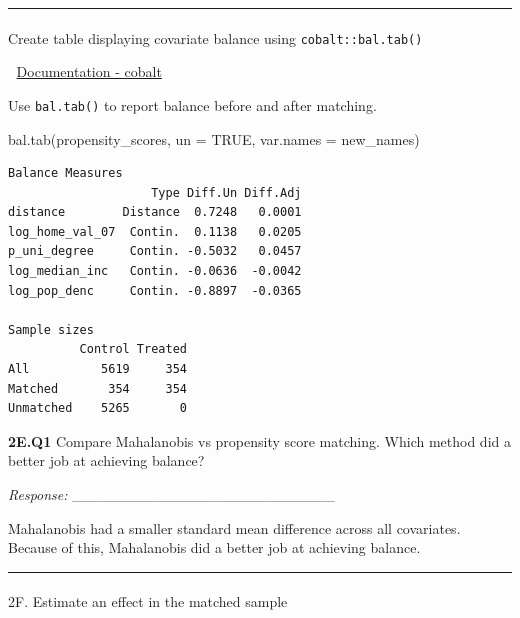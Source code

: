 \documentclass[
  letterpaper,
  DIV=11,
  numbers=noendperiod]{scrartcl}
\makeatletter
\let\oldparagraph\paragraph
\renewcommand{\paragraph}{
    \@ifstar
      \xxxParagraphStar
      \xxxParagraphNoStar
  }
\newcommand{\xxxParagraphStar}[1]{\oldparagraph*{#1}\mbox{}}
\newcommand{\xxxParagraphNoStar}[1]{\oldparagraph{#1}\mbox{}}
\newenvironment{Shaded}{\begin{snugshade}}{\end{snugshade}}
\newcommand{\AttributeTok}[1]{\textcolor[rgb]{0.40,0.45,0.13}{#1}}
\newcommand{\ConstantTok}[1]{\textcolor[rgb]{0.56,0.35,0.01}{#1}}
\newcommand{\FunctionTok}[1]{\textcolor[rgb]{0.28,0.35,0.67}{#1}}
\newcommand{\NormalTok}[1]{\textcolor[rgb]{0.00,0.23,0.31}{#1}}
\makeatother
\begin{document}
\begin{center}\rule{0.5\linewidth}{0.5pt}\end{center}

\paragraph{\texorpdfstring{Create table displaying covariate balance
using
\texttt{cobalt::bal.tab()}}{Create table displaying covariate balance using cobalt::bal.tab()}}\label{create-table-displaying-covariate-balance-using-cobaltbal.tab}

📜 \href{https://ngreifer.github.io/cobalt/}{Documentation - cobalt}

Use \texttt{bal.tab()} to report balance before and after matching.

\begin{Shaded}
\begin{Highlighting}[]
\FunctionTok{bal.tab}\NormalTok{(propensity\_scores, }
        \AttributeTok{un =} \ConstantTok{TRUE}\NormalTok{,}
        \AttributeTok{var.names =}\NormalTok{ new\_names) }
\end{Highlighting}
\end{Shaded}

\begin{verbatim}
Balance Measures
                    Type Diff.Un Diff.Adj
distance        Distance  0.7248   0.0001
log_home_val_07  Contin.  0.1138   0.0205
p_uni_degree     Contin. -0.5032   0.0457
log_median_inc   Contin. -0.0636  -0.0042
log_pop_denc     Contin. -0.8897  -0.0365

Sample sizes
          Control Treated
All          5619     354
Matched       354     354
Unmatched    5265       0
\end{verbatim}

\textbf{2E.Q1} Compare Mahalanobis vs propensity score matching. Which
method did a better job at achieving balance?

\emph{Response:} \_\_\_\_\_\_\_\_\_\_\_\_\_\_\_\_\_\_\_\_\_\_\_\_\_

Mahalanobis had a smaller standard mean difference across all
covariates. Because of this, Mahalanobis did a better job at achieving
balance.

\begin{center}\rule{0.5\linewidth}{0.5pt}\end{center}

\paragraph{2F. Estimate an effect in the matched
sample}\label{f.-estimate-an-effect-in-the-matched-sample}
\end{document}
